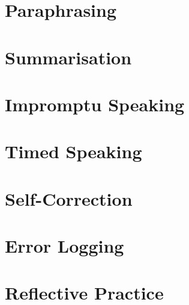 \section{Paraphrasing}
\section{Summarisation}
\section{Impromptu Speaking}
\section{Timed Speaking}
\section{Self-Correction}
\section{Error Logging}
\section{Reflective Practice}